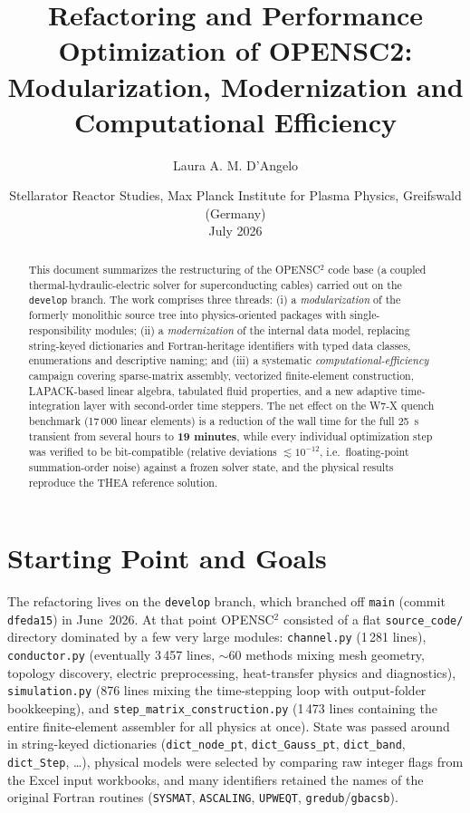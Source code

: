 \documentclass[11pt,a4paper]{article}
\title{Refactoring and Performance Optimization of OPENSC2:\\
Modularization, Modernization and Computational Efficiency}
\author{Laura A. M. D'Angelo}
\date{%
	{\small Stellarator Reactor Studies, Max Planck Institute for Plasma Physics, Greifswald (Germany)}\\[2ex]%
	July 2026}
\newcommand{\code}[1]{\texttt{#1}}
\begin{document}
\maketitle

\begin{abstract}
This document summarizes the restructuring of the OPENSC$^2$ code base (a coupled
thermal-hydraulic-electric solver for superconducting cables) carried out on the
\code{develop} branch. The work comprises three threads: (i) a \emph{modularization}
of the formerly monolithic source tree into physics-oriented packages with
single-responsibility modules; (ii) a \emph{modernization} of the internal data model,
replacing string-keyed dictionaries and Fortran-heritage identifiers with typed
data classes, enumerations and descriptive naming; and (iii) a systematic
\emph{computational-efficiency} campaign covering sparse-matrix assembly, vectorized
finite-element construction, LAPACK-based linear algebra, tabulated fluid properties,
and a new adaptive time-integration layer with second-order time steppers.
The net effect on the W7-X quench benchmark (17\,000 linear elements) is a reduction
of the wall time for the full \SI{25}{s} transient from several hours to
\textbf{19 minutes}, while every individual optimization step was verified to be bit-compatible (relative deviations $\lesssim 10^{-12}$, i.e.\ floating-point summation-order noise) against a frozen solver state, and the physical results reproduce the THEA reference solution.
\end{abstract}

\tableofcontents

\section{Starting Point and Goals}

The refactoring lives on the \code{develop} branch, which branched off \code{main}
(commit \code{dfeda15}) in June~2026. At that point OPENSC$^2$ consisted of a flat
\code{source\_code/} directory dominated by a few very large modules:
\code{channel.py} (1\,281 lines), \code{conductor.py} (eventually 3\,457 lines,
$\sim$60 methods mixing mesh geometry, topology discovery, electric preprocessing,
heat-transfer physics and diagnostics), \code{simulation.py} (876 lines mixing the
time-stepping loop with output-folder bookkeeping), and
\code{step\_matrix\_construction.py} (1\,473 lines containing the entire
finite-element assembler for all physics at once). State was passed around in
string-keyed dictionaries (\code{dict\_node\_pt}, \code{dict\_Gauss\_pt},
\code{dict\_band}, \code{dict\_Step}, \ldots), physical models were selected by
comparing raw integer flags from the Excel input workbooks, and many identifiers
retained the names of the original Fortran routines (\code{SYSMAT}, \code{ASCALING},
\code{UPWEQT}, \code{gredub}/\code{gbacsb}).
\end{document}
